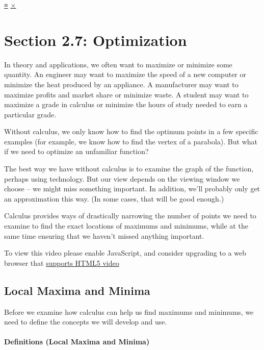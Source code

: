 \protect\hyperlink{main-nav}{≡} \protect\hyperlink{close-nav}{×}

\hypertarget{section-2.7-optimization}{%
\section{Section 2.7: Optimization}\label{section-2.7-optimization}}

In theory and applications, we often want to maximize or minimize some
quantity. An engineer may want to maximize the speed of a new computer
or minimize the heat produced by an appliance. A manufacturer may want
to maximize profits and market share or minimize waste. A student may
want to maximize a grade in calculus or minimize the hours of study
needed to earn a particular grade.

Without calculus, we only know how to find the optimum points in a few
specific examples (for example, we know how to find the vertex of a
parabola). But what if we need to optimize an unfamiliar function?

The best way we have without calculus is to examine the graph of the
function, perhaps using technology. But our view depends on the viewing
window we choose -- we might miss something important. In addition,
we'll probably only get an approximation this way. (In some cases, that
will be good enough.)

Calculus provides ways of drastically narrowing the number of points we
need to examine to find the exact locations of maximums and minimums,
while at the same time ensuring that we haven't missed anything
important.

To view this video please enable JavaScript, and consider upgrading to a
web browser that \href{http://videojs.com/html5-video-support/}{supports
HTML5 video}

\hypertarget{local-maxima-and-minima}{%
\subsection{Local Maxima and Minima}\label{local-maxima-and-minima}}

Before we examine how calculus can help us find maximums and minimums,
we need to define the concepts we will develop and use.

\hypertarget{definitions-local-maxima-and-minima}{%
\paragraph{Definitions (Local Maxima and
Minima)}\label{definitions-local-maxima-and-minima}}

